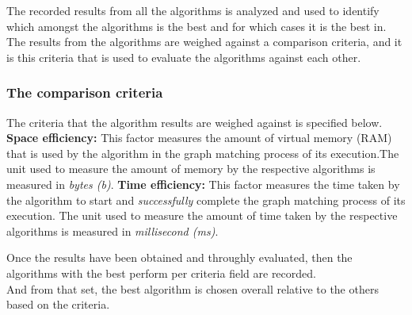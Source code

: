 The recorded results from all the algorithms is analyzed and used to identify which amongst the algorithms is the best and for which cases it is the best in.\\
The results from the algorithms are weighed against a comparison criteria, and it is this criteria that is used to evaluate the algorithms against each other.\\

\subsubsection{The comparison criteria}
The criteria that the algorithm results are weighed against is specified below.\newline\newline
\textbf{Space efficiency:} This factor measures the amount of virtual memory (RAM) that is used by the algorithm in the graph matching process of its
execution.The unit used to measure the amount of memory  by the respective algorithms is measured in \textit{bytes (b)}. \newline\newline
\textbf{Time efficiency:} This factor measures the time taken by the algorithm to start and \textit{successfully} complete the graph matching process of its
execution. The unit used to measure the amount of time taken by the respective algorithms is measured in \textit{millisecond (ms)}. \newline\newline
 \break
 
Once the results have been obtained and throughly evaluated, then the algorithms with the best perform per criteria field are recorded.\\
And from that set, the best algorithm is chosen overall relative to the others based on the criteria.